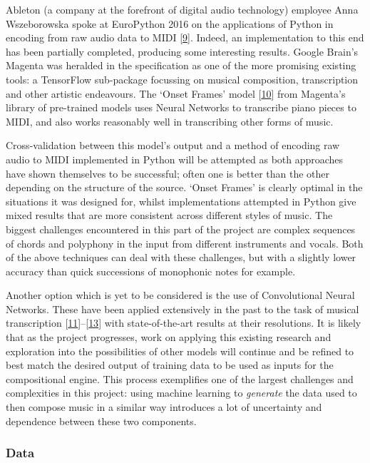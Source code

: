\documentclass[12pt,]{article}
\begin{document}
Ableton (a company at the forefront of digital audio technology)
employee Anna Wszeborowska spoke at EuroPython 2016 on the applications
of Python in encoding from raw audio data to MIDI
{[}\protect\hyperlink{ref-annaw}{9}{]}. Indeed, an implementation to
this end has been partially completed, producing some interesting
results. Google Brain's Magenta was heralded in the specification as one
of the more promising existing tools: a TensorFlow sub-package focussing
on musical composition, transcription and other artistic endeavours. The
`Onset Frames' model
{[}\protect\hyperlink{ref-magentaonsetframes}{10}{]} from Magenta's
library of pre-trained models uses Neural Networks to transcribe piano
pieces to MIDI, and also works reasonably well in transcribing other
forms of music.

Cross-validation between this model's output and a method of encoding
raw audio to MIDI implemented in Python will be attempted as both
approaches have shown themselves to be successful; often one is better
than the other depending on the structure of the source. `Onset Frames'
is clearly optimal in the situations it was designed for, whilst
implementations attempted in Python give mixed results that are more
consistent across different styles of music. The biggest challenges
encountered in this part of the project are complex sequences of chords
and polyphony in the input from different instruments and vocals. Both
of the above techniques can deal with these challenges, but with a
slightly lower accuracy than quick successions of monophonic notes for
example.

Another option which is yet to be considered is the use of Convolutional
Neural Networks. These have been applied extensively in the past to the
task of musical transcription
{[}\protect\hyperlink{ref-bereketai}{11}{]}--{[}\protect\hyperlink{ref-sigtia2016end}{13}{]}
with state-of-the-art results at their resolutions. It is likely that as
the project progresses, work on applying this existing research and
exploration into the possibilities of other models will continue and be
refined to best match the desired output of training data to be used as
inputs for the compositional engine. This process exemplifies one of the
largest challenges and complexities in this project: using machine
learning to \emph{generate} the data used to then compose music in a
similar way introduces a lot of uncertainty and dependence between these
two components.

\hypertarget{data}{%
\subsubsection{Data}\label{data}}
\end{document}
